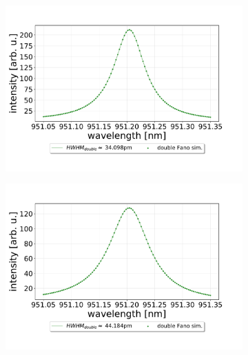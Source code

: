 \begin{figure}[h!]
\begin{subfigure}[b]{0.49\textwidth}
        \label{fig:2_percent_loss}
    \end{subfigure}
    \begin{subfigure}[b]{0.49\textwidth}
        \includegraphics[width=\textwidth]{figures/double_4percent_loss_30um.pdf}
        \caption{}
        \label{fig:4_percent_loss}
    \end{subfigure}
    \begin{subfigure}[b]{0.49\textwidth}
        \includegraphics[width=\textwidth]{figures/double_8percent_loss_30um.pdf}
        \caption{}
        \label{fig:8_percent_loss}
    \end{subfigure}
    \begin{subfigure}[b]{0.49\textwidth}

\end{subfigure}
\end{figure}
